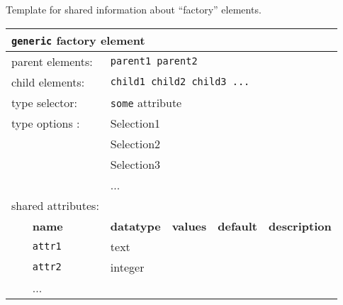 Template for shared information about ``factory'' elements.
\FloatBarrier
\begin{table}[h]
\begin{center}
\begin{tabularx}{\textwidth}{l l l l l l }
\hline
\multicolumn{6}{l}{\texttt{generic} factory element} \\
\hline
\multicolumn{2}{l}{parent elements:} & \multicolumn{4}{l}{\texttt{parent1 parent2}}\\
\multicolumn{2}{l}{child  elements:} & \multicolumn{4}{l}{\texttt{child1 child2 child3 ...}}\\
\multicolumn{2}{l}{type   selector:} & \multicolumn{4}{l}{\texttt{some} attribute}\\
\multicolumn{2}{l}{type   options :} & \multicolumn{4}{l}{Selection1}\\
\multicolumn{2}{l}{                } & \multicolumn{4}{l}{Selection2}\\
\multicolumn{2}{l}{                } & \multicolumn{4}{l}{Selection3}\\
\multicolumn{2}{l}{                } & \multicolumn{4}{l}{...}\\
\multicolumn{2}{l}{shared attributes:} & \multicolumn{4}{l}{}\\
   &   \bfseries name     & \bfseries datatype & \bfseries values & \bfseries default   & \bfseries description \\
   &   \texttt{attr1}     &  text              &                  &                     &                       \\
   &   \texttt{attr2}     &  integer           &                  &                     &                       \\
   &   ...                &                    &                  &                     &                       \\
  \hline
\end{tabularx}
\end{center}
\end{table}
\FloatBarrier
